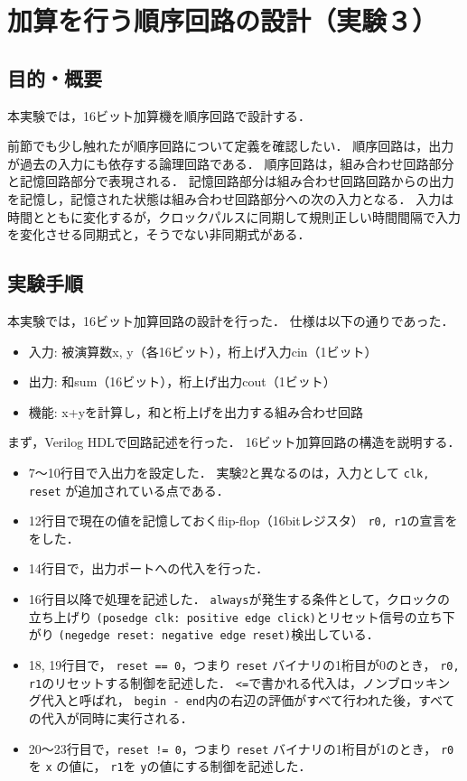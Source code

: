 \documentclass[uplatex]{jsarticle}
\begin{document}
\section{加算を行う順序回路の設計（実験３）}

\subsection{目的・概要}

本実験では，16ビット加算機を順序回路で設計する．

前節でも少し触れたが順序回路について定義を確認したい．
順序回路は，出力が過去の入力にも依存する論理回路である．
順序回路は，組み合わせ回路部分と記憶回路部分で表現される．
記憶回路部分は組み合わせ回路回路からの出力を記憶し，記憶された状態は組み合わせ回路部分への次の入力となる．
入力は時間とともに変化するが，クロックパルスに同期して規則正しい時間間隔で入力を変化させる同期式と，そうでない非同期式がある．



\subsection{実験手順}

本実験では，16ビット加算回路の設計を行った．
仕様は以下の通りであった．

\begin{itemize}
  \item 入力: 被演算数x, y（各16ビット），桁上げ入力cin（1ビット）
  \item 出力: 和sum（16ビット），桁上げ出力cout（1ビット）
  \item 機能: x+yを計算し，和と桁上げを出力する組み合わせ回路
\end{itemize}

まず，Verilog HDLで回路記述を行った．
16ビット加算回路の構造を説明する．

\begin{itemize}
  \item 
    7〜10行目で入出力を設定した．
    実験2と異なるのは，入力として {\tt clk, reset} が追加されている点である．
  \item 
    12行目で現在の値を記憶しておくflip-flop（16bitレジスタ） {\tt r0, r1}の宣言ををした．
  \item 14行目で，出力ポートへの代入を行った．
  \item 
    16行目以降で処理を記述した．
    {\tt always}が発生する条件として，クロックの立ち上げり {\tt (posedge clk: positive edge click)}とリセット信号の立ち下がり {\tt (negedge reset: negative edge reset)}検出している．
  \item 
    18, 19行目で， {\tt reset == 0}，つまり {\tt reset} バイナリの1桁目が0のとき， {\tt r0, r1}のリセットする制御を記述した．
    {\tt <=}で書かれる代入は，ノンブロッキング代入と呼ばれ， {\tt begin - end}内の右辺の評価がすべて行われた後，すべての代入が同時に実行される．
  \item
    20〜23行目で，{\tt reset != 0}，つまり {\tt reset} バイナリの1桁目が1のとき， {\tt r0}を {\tt x} の値に， {\tt r1}を {\tt y}の値にする制御を記述した．
\end{itemize}
\end{document}
